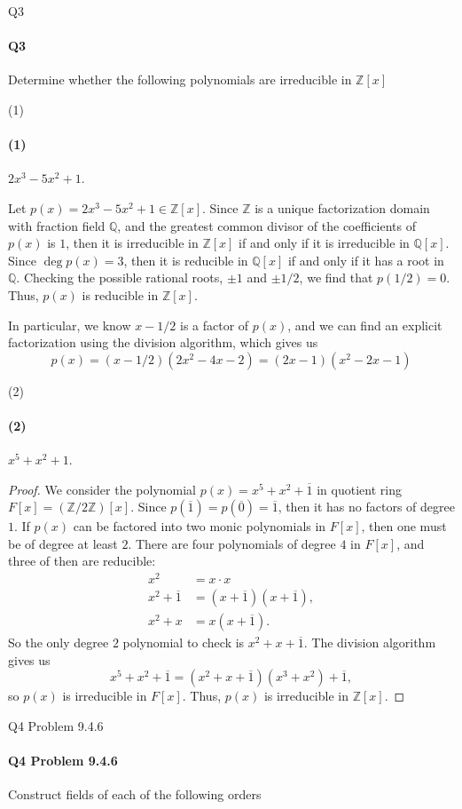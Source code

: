\documentclass[12pt]{article}
\newenvironment{fullbox}{\begin{lrbox}{\savefullbox}\begin{minipage}{\dimexpr\textwidth-2\fboxsep\relax}}{\end{minipage}\end{lrbox}\begin{center}\framebox[\textwidth]{\usebox{\savefullbox}}\end{center}}
\newenvironment{pbox}[1][]{\begin{fullbox}\ifx#1\empty\else\paragraph{#1}\fi}{\end{fullbox}}
\theoremstyle{definition}
\newcommand{\Z}{\mathbb{Z}}
\newcommand{\Q}{\mathbb{Q}}
\newcommand{\eqc}{\overline}
\begin{document}
\newpage
\begin{pbox}[Q3]
    Determine whether the following polynomials are irreducible in $\Z[x]$
\end{pbox}

\begin{pbox}[(1)]
    $2x^3 - 5x^2 + 1$.
\end{pbox}

Let $p(x) = 2x^3 - 5x^2 + 1 \in \Z[x]$. Since $\Z$ is a unique factorization domain with fraction field $\Q$, and the greatest common divisor of the coefficients of $p(x)$ is $1$, then it is irreducible in $\Z[x]$ if and only if it is irreducible in $\Q[x]$. Since $\deg p(x) = 3$, then it is reducible in $\Q[x]$ if and only if it has a root in $\Q$. Checking the possible rational roots, $\pm1$ and $\pm1/2$, we find that $p(1/2) = 0$. Thus, $p(x)$ is reducible in $\Z[x]$.

In particular, we know $x - 1/2$ is a factor of $p(x)$, and we can find an explicit factorization using the division algorithm, which gives us
\[
    p(x) = (x - 1/2)(2x^2 - 4x - 2) = (2x - 1)(x^2 - 2x - 1)
\]

\begin{pbox}[(2)]
    $ x^5 + x^2 + 1$.
\end{pbox}

\begin{proof}
    We consider the polynomial $p(x) = x^5 + x^2 + \eqc{1}$ in quotient ring $F[x] = (\Z/2\Z)[x]$. Since $p(\eqc{1}) = p(\eqc{0}) = \eqc{1}$, then it has no factors of degree $1$. If $p(x)$ can be factored into two monic polynomials in $F[x]$, then one must be of degree at least $2$. There are four polynomials of degree $4$ in $F[x]$, and three of then are reducible:
    \begin{align*}
        x^2 &= x \cdot x \\
        x^2 + \eqc{1} &= (x + \eqc{1})(x + \eqc{1}), \\
        x^2 + x &= x(x + \eqc{1}).
    \end{align*}
    So the only degree $2$ polynomial to check is $x^2 + x + \eqc{1}$. The division algorithm gives us
    \[
        x^5 + x^2 + \eqc{1} = (x^2 + x + \eqc{1})(x^3 + x^2) + \eqc{1},
    \]
    so $p(x)$ is irreducible in $F[x]$. Thus, $p(x)$ is irreducible in $\Z[x]$.
    
\end{proof}


\newpage
\begin{pbox}[Q4 Problem 9.4.6]
    Construct fields of each of the following orders
\end{pbox}
\end{document}
